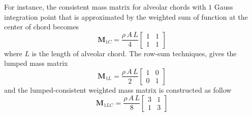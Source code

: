 For instance, the consistent mass matrix for alveolar chords with $1$ Gauss integration point that is approximated by the weighted sum of function at the center of chord becomes
\begin{equation}
\mathbf{M}_{1C}  = \frac{\rho \, A \, L}{4}\begin{bmatrix}
1 & 1 \\
1 & 1
\end{bmatrix} 
	\label{ConsMassMatrix1D}
\end{equation}
where $L$ is the length of alveolar chord. The row-sum techniques, gives the lumped mass matrix
\begin{equation}
\mathbf{M}_{1L}  = \frac{\rho \, A \, L}{2}\begin{bmatrix}
1 & 0 \\
0 & 1
\end{bmatrix} 
\label{LumMassMatrix1D}
\end{equation}
and the lumped-consistent weighted mass matrix is constructed as follow 
\begin{equation}
\mathbf{M}_{1LC}  = \frac{\rho \, A \, L}{8}\begin{bmatrix}
3 & 1 \\
1 & 3
\end{bmatrix} 
\label{LumconsMassMatrix1D}
\end{equation}


